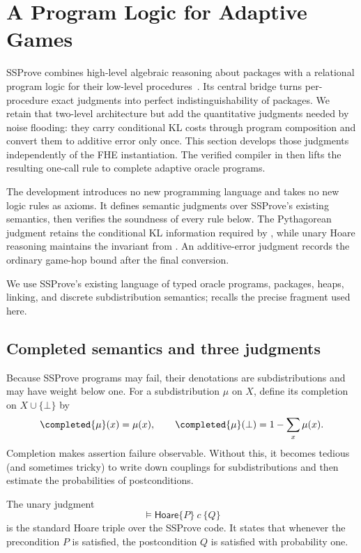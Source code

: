 \section{A Program Logic for Adaptive Games}
\label{sec:pyth-toolkit}

SSProve combines high-level algebraic reasoning about packages with a relational program logic for their low-level procedures~\cite{ssprove}.
Its central bridge turns per-procedure exact judgments into perfect indistinguishability of packages.
We retain that two-level architecture but add the quantitative judgments needed
by noise flooding: they carry conditional KL costs through program composition
and convert them to additive error only once.
This section develops those judgments independently of the FHE instantiation.
The verified compiler in  then lifts the resulting
one-call rule to complete adaptive oracle programs.

The development introduces no new programming language and takes no new logic
rules as axioms.
It defines semantic judgments over SSProve's existing semantics, then verifies the soundness of every rule below.
The Pythagorean judgment retains the conditional KL information required by
, while unary Hoare reasoning maintains the invariant from
.
An additive-error judgment records the ordinary game-hop bound after the final
conversion.

We use SSProve's existing language of typed oracle programs, packages, heaps,
linking, and discrete subdistribution semantics; 
recalls the precise fragment used here.

\subsection{Completed semantics and three judgments}

Because SSProve programs may fail, their denotations are subdistributions and
may have weight below one.
For
a subdistribution \(\mu\) on \(X\), define its completion on
\(X\cup\{\bot\}\) by
\[
 \completed{\mu}(x)=\mu(x),\qquad
 \completed{\mu}(\bot)=1-\sum_x\mu(x).
\]
Completion makes assertion failure observable.
Without this, it becomes tedious (and sometimes tricky) to write down couplings for subdistributions and then estimate the probabilities of postconditions.

The unary judgment
\[
 \vDash\mathsf{Hoare}\{P\}\ c\ \{Q\}
\]
is the standard Hoare triple over the SSProve code.
It states that whenever the precondition \(P\) is satisfied,
the postcondition \(Q\) is satisfied with probability one.

